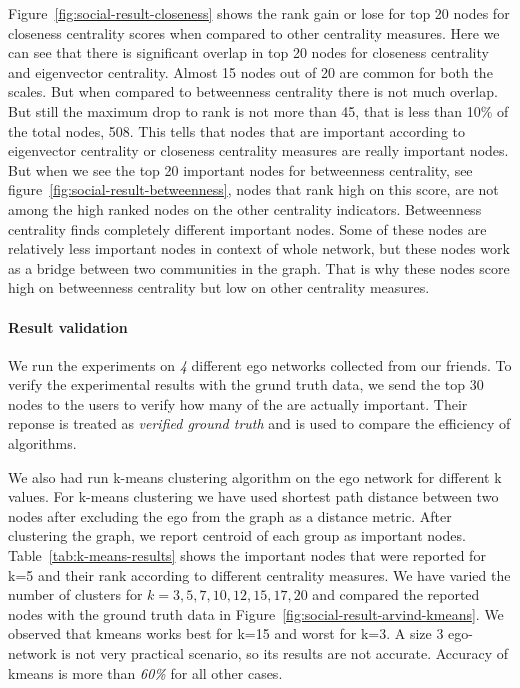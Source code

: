 Figure~\ref{fig:social-result-closeness} shows the rank gain or lose for
top 20 nodes for closeness centrality scores when compared to other
centrality measures.  Here we can see that there is significant
overlap in top 20 nodes for closeness centrality and eigenvector
centrality.  Almost 15 nodes out of 20 are common for both the scales.
But when compared to betweenness centrality there is not much overlap.
But still the maximum drop to rank is not more than 45, that is less
than 10\% of the total nodes, 508.  This tells
that nodes that are important according to eigenvector centrality or
closeness centrality measures are really important nodes.  But when we
see the top 20 important nodes for betweenness centrality, see
figure~\ref{fig:social-result-betweenness}, nodes that rank high on
this score, are not among the high ranked nodes on the other
centrality indicators.  Betweenness centrality finds completely
different important nodes.  Some of these nodes are relatively less
important nodes in context of whole network, but these nodes work as a
bridge between two communities in the graph.  That is why these nodes
score high on betweenness centrality but low on other centrality
measures.



\paragraph{Result validation}
We run the experiments on \emph{4} different ego networks collected
from our friends.  To verify the experimental results with the grund
truth data, we send the top 30 nodes to the users to verify how many
of the are actually important.  Their reponse is treated as
\emph{verified ground truth} and is used to compare the efficiency of
algorithms.

We also had run k-means clustering algorithm on the ego network for
different k values.  For k-means clustering we have used shortest path
distance between two nodes after excluding the ego from the graph as a
distance metric.  After clustering the graph, we report centroid of
each group as important nodes.  Table~\ref{tab:k-means-results} shows
the important nodes that were reported for k=5 and their rank
according to different centrality measures.   We have varied the
number of clusters for $k=3,5,7,10,12,15,17,20$ and compared the
reported nodes with the ground truth data in
Figure~\ref{fig:social-result-arvind-kmeans}.  We observed that kmeans
works best for k=15 and worst for k=3.  A size 3 ego-network is not
very practical scenario, so its results are not accurate.  Accuracy of
kmeans is more than \emph{60\%} for all other cases.

